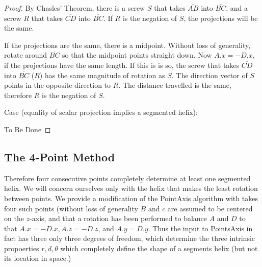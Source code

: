 \documentclass[11pt]{article}
\begin{document}
{\begin{proof}
  By Chasles' Theorem, there is a screw $S$ that takes $\overline{AB}$ into $\overline{BC}$, and a screw $R$ that
  takes  $\overline{CD}$ into $\overline{BC}$. If $R$ is the negation of $S$, the projections will be the same.

  If the projections are the same, there is a midpoint. Without loss of generality, rotate around $\overline{BC}$ so that
  the midpoint points straight down. Now $A.x = -D.x$, if the projections have the same length. If this is is so, the
  screw that takes $\overline{CD}$ into $\overline{BC}$ ($R$) has the same magnitude of rotation as $S$.
  The direction vector of $S$ points in the opposite direction to $R$. The distance travelled is the same, therefore $R$
  is the negation of $S$.

  Case (equality of scalar projection implies a segmented helix):

  To Be Done

\end{proof}

\subsection{The 4-Point Method}

Therefore four consecutive points completely determine at least one segmented helix. We will concern ourselves
only with the helix that makes the least rotation between points.
We provide a modification of the PointAxis algorithm
with takes four such points (without loss of generality $B$ and $c$ are assumed to be centered on the $z$-axis, and that a
rotation has been performed to balance $A$ and $D$ to that $A.x = -D.x, A.z = - D.z$, and $A.y = D.y$. Thus the input to
PointsAxis in fact has three only three degrees of freedom, which determine the three intrinsic propoerties $r,d,\theta$
which completely define the shape of a segments helix (but not its location in space.)


}
\end{document}
